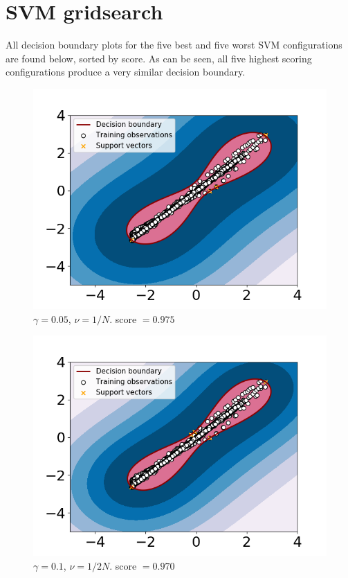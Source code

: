 
\chapter{SVM gridsearch}\label{apendix:svm_grid}
    All decision boundary plots for the five best and five worst SVM configurations are found below, sorted by score. As can be seen, all five highest scoring configurations produce a very similar decision boundary.  

    \begin{figure}
        \centering
        \includegraphics[width = .7\textwidth]{report/figures/analysis/gridsearch/Novelty detection, 1, training, gamma = 0.05 nu = 1.0583130489998942e-05.png}
        \caption{$\gamma = 0.05$, $\nu = 1/N$. score $=0.975$}
        \label{fig:my_label}
    \end{figure}
    
    \begin{figure}
        \centering
        \includegraphics[width = .7\textwidth]{report/figures/analysis/gridsearch/Novelty detection, 2 training, gamma = 0.1 nu = 5.291565244999471e-05.png}
        \caption{$\gamma = 0.1$, $\nu = 1/2N$. score $=0.970$}
        \label{fig:my_label}
    \end{figure}
    
